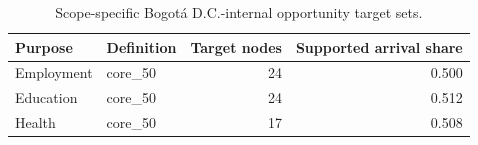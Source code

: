 \begin{table}
\caption{Scope-specific Bogotá D.C.-internal opportunity target sets.}
\label{tab:s6_targets}
\begin{tabular}{llrr}
\toprule
Purpose & Definition & Target nodes & Supported arrival share \\
\midrule
Employment & core\_50 & 24 & 0.500 \\
Education & core\_50 & 24 & 0.512 \\
Health & core\_50 & 17 & 0.508 \\
\bottomrule
\end{tabular}
\end{table}
